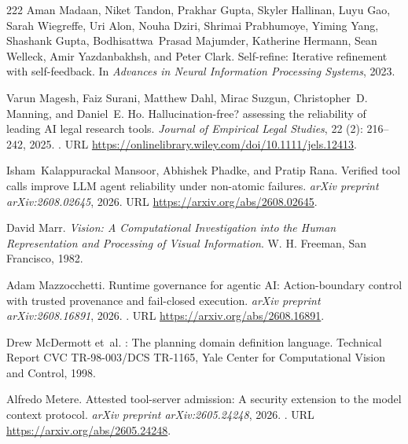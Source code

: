 \begin{thebibliography}{222}
Aman Madaan, Niket Tandon, Prakhar Gupta, Skyler Hallinan, Luyu Gao, Sarah
  Wiegreffe, Uri Alon, Nouha Dziri, Shrimai Prabhumoye, Yiming Yang, Shashank
  Gupta, Bodhisattwa~Prasad Majumder, Katherine Hermann, Sean Welleck, Amir
  Yazdanbakhsh, and Peter Clark.
\newblock Self-refine: Iterative refinement with self-feedback.
\newblock In \emph{Advances in Neural Information Processing Systems}, 2023.

Varun Magesh, Faiz Surani, Matthew Dahl, Mirac Suzgun, Christopher~D. Manning,
  and Daniel~E. Ho.
\newblock Hallucination-free? assessing the reliability of leading {AI} legal
  research tools.
\newblock \emph{Journal of Empirical Legal Studies}, 22 (2):
  216--242, 2025.
\newblock {}.
\newblock URL \url{https://onlinelibrary.wiley.com/doi/10.1111/jels.12413}.

Isham~Kalappurackal Mansoor, Abhishek Phadke, and Pratip Rana.
\newblock Verified tool calls improve {LLM} agent reliability under non-atomic
  failures.
\newblock \emph{arXiv preprint arXiv:2608.02645}, 2026.
\newblock URL \url{https://arxiv.org/abs/2608.02645}.

David Marr.
\newblock \emph{Vision: A Computational Investigation into the Human
  Representation and Processing of Visual Information}.
\newblock W. H. Freeman, San Francisco, 1982.

Adam Mazzocchetti.
\newblock Runtime governance for agentic {AI}: Action-boundary control with
  trusted provenance and fail-closed execution.
\newblock \emph{arXiv preprint arXiv:2608.16891}, 2026.
\newblock {}.
\newblock URL \url{https://arxiv.org/abs/2608.16891}.

Drew McDermott et~al.
: The planning domain definition language.
\newblock Technical Report CVC TR-98-003/DCS TR-1165, Yale Center for
  Computational Vision and Control, 1998.

Alfredo Metere.
\newblock Attested tool-server admission: A security extension to the model
  context protocol.
\newblock \emph{arXiv preprint arXiv:2605.24248}, 2026.
\newblock {}.
\newblock URL \url{https://arxiv.org/abs/2605.24248}.


\end{thebibliography}
